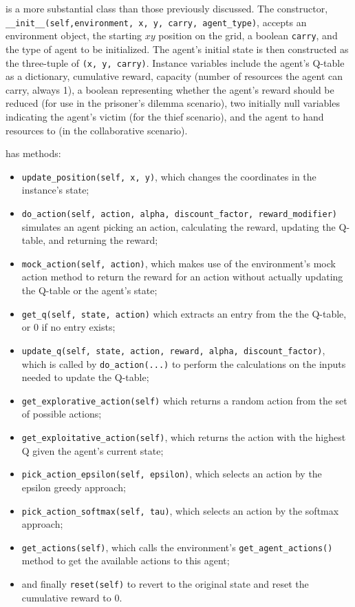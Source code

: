 \documentclass[11pt]{article}
\begin{document}
 is a more substantial class than those previously discussed. The constructor, \texttt{__init__(self,environment, x, y, carry, agent_type)}, accepts an environment object, the starting $xy$ position on the grid, a boolean \texttt{carry}, and the type of agent to be initialized. The agent's initial state is then constructed as the three-tuple of \texttt{(x, y, carry)}. Instance variables include the agent's Q-table as a dictionary, cumulative reward, capacity (number of resources the agent can carry, always 1), a boolean representing whether the agent's reward should be reduced (for use in the prisoner's dilemma scenario), two initially null variables indicating the agent's victim (for the thief scenario), and the agent to hand resources to (in the collaborative scenario).

 has methods:
\begin{itemize}
\item \texttt{update_position(self, x, y)}, which changes the coordinates in the instance's state;
\item \texttt{do_action(self, action, alpha, discount_factor, reward_modifier)} simulates an agent picking an action, calculating the reward, updating the Q-table, and returning the reward;
\item \texttt{mock_action(self, action)}, which makes use of the environment's mock action method to return the reward for an action without actually updating the Q-table or the agent's state;
\item \texttt{get_q(self, state, action)} which extracts an entry from the the Q-table, or 0 if no entry exists;
\item \texttt{update_q(self, state, action, reward, alpha, discount_factor)}, which is called by \texttt{do_action(...)} to perform the calculations on the inputs needed to update the Q-table;
\item \texttt{get_explorative_action(self)} which returns a random action from the set of possible actions;
\item \texttt{get_exploitative_action(self)}, which returns the action with the highest Q given the agent's current state;
\item \texttt{pick_action_epsilon(self, epsilon)}, which selects an action by the epsilon greedy approach;
\item \texttt{pick_action_softmax(self, tau)}, which selects an action by the softmax approach;
\item \texttt{get_actions(self)}, which calls the environment's \texttt{get_agent_actions()} method to get the available actions to this agent;
\item and finally \texttt{reset(self)} to revert to the original state and reset the cumulative reward to 0.
\end{itemize}
\end{document}

